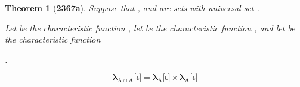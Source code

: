 \documentclass[preview]{standalone}
\newtheorem{theorem}{Theorem}
\begin{document}
\begin{theorem}[\textbf{2367a}]
    Suppose that , and \bm{$\Lambda$} are sets with universal set \bm{$\Omega$}. 
    \begin{center}
        Let  be the characteristic function 
        , 
        let  be the characteristic function 
        ,
        and let \bm{$\lambda_{\Lambda}$} be the characteristic function  
        \raggedright {}.
    \end{center}
    \begin{equation*}
        \bm{
            \lambda_{\mathrm{A} \cap \Lambda}\big[ \iota \big] 
                = 
            \lambda_{\mathrm{A}}\big[ \iota \big] 
                \times 
            \lambda_{\Lambda}\big[ \iota \big]
            }
    \end{equation*}
\end{theorem}
\end{document}

